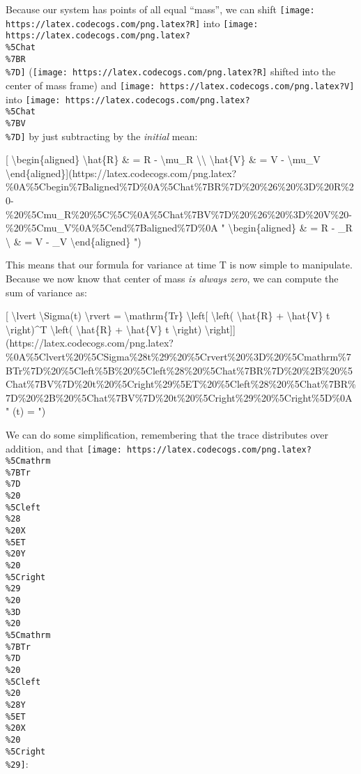 \documentclass[]{article}
\begin{document}
Because our system has points of all equal ``mass'', we can shift
\texttt{[image: https://latex.codecogs.com/png.latex?R]} into
\texttt{[image: https://latex.codecogs.com/png.latex?\\\%5Chat\\\%7BR\\\%7D]}
(\texttt{[image: https://latex.codecogs.com/png.latex?R]} shifted into the
center of mass frame) and
\texttt{[image: https://latex.codecogs.com/png.latex?V]} into
\texttt{[image: https://latex.codecogs.com/png.latex?\\\%5Chat\\\%7BV\\\%7D]} by just
subtracting by the \emph{initial} mean:

{[} \textbackslash{}begin\{aligned\} \textbackslash{}hat\{R\} \& = R -
\textbackslash{}mu\_R \textbackslash{}\textbackslash{} \textbackslash{}hat\{V\}
\& = V - \textbackslash{}mu\_V
\textbackslash{}end\{aligned\}{]}(https://latex.codecogs.com/png.latex?\%0A\%5Cbegin\%7Baligned\%7D\%0A\%5Chat\%7BR\%7D\%20\%26\%20\%3D\%20R\%20-\%20\%5Cmu\_R\%20\%5C\%5C\%0A\%5Chat\%7BV\%7D\%20\%26\%20\%3D\%20V\%20-\%20\%5Cmu\_V\%0A\%5Cend\%7Baligned\%7D\%0A
" \textbackslash{}begin\{aligned\}  \& = R - \mu\_R \textbackslash{}
 \& = V - \mu\_V \textbackslash{}end\{aligned\} ")

This means that our formula for variance at time T is now simple to manipulate.
Because we now know that center of mass \emph{is always zero}, we can compute
the sum of variance as:

{[} \textbackslash{}lvert \textbackslash{}Sigma(t) \textbackslash{}rvert =
\textbackslash{}mathrm\{Tr\} \textbackslash{}left{[} \textbackslash{}left(
\textbackslash{}hat\{R\} + \textbackslash{}hat\{V\} t
\textbackslash{}right)\^{}T \textbackslash{}left( \textbackslash{}hat\{R\} +
\textbackslash{}hat\{V\} t \textbackslash{}right)
\textbackslash{}right{]}{]}(https://latex.codecogs.com/png.latex?\%0A\%5Clvert\%20\%5CSigma\%28t\%29\%20\%5Crvert\%20\%3D\%20\%5Cmathrm\%7BTr\%7D\%20\%5Cleft\%5B\%20\%5Cleft\%28\%20\%5Chat\%7BR\%7D\%20\%2B\%20\%5Chat\%7BV\%7D\%20t\%20\%5Cright\%29\%5ET\%20\%5Cleft\%28\%20\%5Chat\%7BR\%7D\%20\%2B\%20\%5Chat\%7BV\%7D\%20t\%20\%5Cright\%29\%20\%5Cright\%5D\%0A
" \lvert \Sigma(t) \rvert = 
")

We can do some simplification, remembering that the trace distributes over
addition, and that
\texttt{[image: https://latex.codecogs.com/png.latex?\\\%5Cmathrm\\\%7BTr\\\%7D\\\%20\\\%5Cleft\\\%28\\\%20X\\\%5ET\\\%20Y\\\%20\\\%5Cright\\\%29\\\%20\\\%3D\\\%20\\\%5Cmathrm\\\%7BTr\\\%7D\\\%20\\\%5Cleft\\\%20\\\%28Y\\\%5ET\\\%20X\\\%20\\\%5Cright\\\%29]}:
\end{document}

